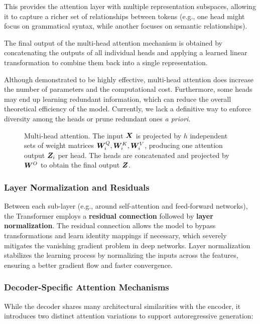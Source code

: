 This provides the attention layer with multiple representation subspaces, allowing it to capture a richer set of relationships between tokens (e.g., one head might focus on grammatical syntax, while another focuses on semantic relationships).

The final output of the multi-head attention mechanism is obtained by concatenating the outputs of all individual heads and applying a learned linear transformation to combine them back into a single representation.

Although demonstrated to be highly effective, multi-head attention does increase the number of parameters and the computational cost. Furthermore, some heads may end up learning redundant information, which can reduce the overall theoretical efficiency of the model. Currently, we lack a definitive way to enforce diversity among the heads or prune redundant ones \textit{a priori}.

\begin{figure}[H]
    \centering
    \resizebox{0.44\textwidth}{!}{}
    \caption{Multi-head attention. The input $\boldsymbol{X}$ is projected by $h$ independent sets of weight matrices $\boldsymbol{W}_i^Q, \boldsymbol{W}_i^K, \boldsymbol{W}_i^V$, producing one attention output $\boldsymbol{Z}_i$ per head. The heads are concatenated and projected by $\boldsymbol{W}^O$ to obtain the final output $\boldsymbol{Z}$.}
\end{figure}

\subsubsection{Layer Normalization and Residuals}
Between each sub-layer (e.g., around self-attention and feed-forward networks), the Transformer employs a \textbf{residual connection} followed by \textbf{layer normalization}.
The residual connection allows the model to bypass transformations and learn identity mappings if necessary, which severely mitigates the vanishing gradient problem in deep networks.
Layer normalization stabilizes the learning process by normalizing the inputs across the features, ensuring a better gradient flow and faster convergence.

\subsubsection{Decoder-Specific Attention Mechanisms}
While the decoder shares many architectural similarities with the encoder, it introduces two distinct attention variations to support autoregressive generation:

